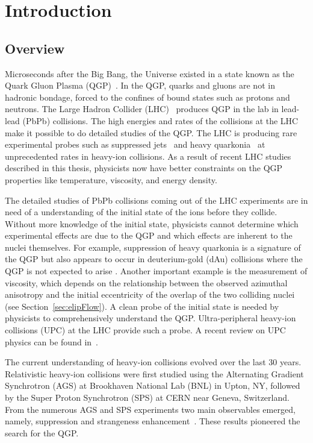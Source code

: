 \chapter{Introduction}
  \section{Overview}
  Microseconds after the Big Bang, the Universe existed in a state known as
    the Quark Gluon Plasma (QGP)~\cite{Witten:1984rs,Vogt:1998kna}.
  In the QGP, quarks and gluons are not in hadronic bondage, forced to 
    the confines of bound states such as protons and neutrons.
  The Large Hadron Collider (LHC)~\cite{Evans:2008zzb} produces QGP in the lab in lead-lead (PbPb)
    collisions.
  The high energies and rates of the collisions at the LHC make it possible 
    to do detailed studies of the QGP. 
  The LHC is producing rare experimental probes such as suppressed jets~\cite{Gyulassy:1990ye} and 
    heavy quarkonia~\cite{Matsui:1986dk} at unprecedented rates in heavy-ion collisions. 
  As a result of recent LHC studies described in this thesis, physicists now 
    have better constraints on the QGP properties like temperature, viscosity, 
    and energy density.

  The detailed studies of PbPb collisions coming out of the LHC 
    experiments are in need of a understanding of the initial state of the ions 
    before they collide.
  Without more knowledge of the initial state, physicists cannot determine 
    which experimental effects are due to the QGP and which effects are 
    inherent to the nuclei themselves. 
  For example, suppression of heavy quarkonia is a signature of the QGP 
    but also appears to occur in deuterium-gold (dAu) collisions where the QGP 
    is not expected to arise \cite{dAuOniaPHENIX}. 
  Another important example is the measurement of viscosity, which depends on 
    the relationship between the observed azimuthal anisotropy and the 
    initial eccentricity of the overlap of the two colliding nuclei 
    (see Section~\ref{sec:elipFlow}). 
  A clean probe of the initial state is needed by physicists to comprehensively 
    understand the QGP.
  Ultra-peripheral heavy-ion collisions (UPC) at the LHC provide such a probe. 
  A recent review on UPC physics can be found in~\cite{Baltz:2007kq,Bertulani:2005ru}.

  The current understanding of heavy-ion collisions evolved over the
    last 30 years.
  Relativistic heavy-ion collisions were first studied using the 
    Alternating Gradient Synchrotron (AGS) at Brookhaven National Lab (BNL) 
    in Upton, NY, followed by the Super Proton Synchrotron (SPS) at CERN near 
    Geneva, Switzerland. 
  From the numerous AGS and SPS experiments two main observables emerged,
    namely, \JPsi{} suppression and strangeness enhancement~\cite{Margetis:2000sv}. 
  These results pioneered the search for the QGP. 


